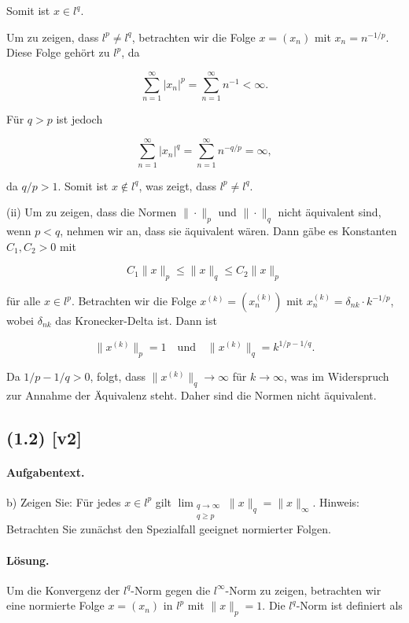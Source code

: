 \documentclass[11pt,a4paper]{article}
\begin{document}
Somit ist \( x \in l^q \).

Um zu zeigen, dass \( l^p \neq l^q \), betrachten wir die Folge \( x = (x_n) \) mit \( x_n = n^{-1/p} \). Diese Folge gehört zu \( l^p \), da

\[
\sum_{n=1}^{\infty} |x_n|^p = \sum_{n=1}^{\infty} n^{-1} < \infty.
\]

Für \( q > p \) ist jedoch

\[
\sum_{n=1}^{\infty} |x_n|^q = \sum_{n=1}^{\infty} n^{-q/p} = \infty,
\]

da \( q/p > 1 \). Somit ist \( x \notin l^q \), was zeigt, dass \( l^p \neq l^q \).

(ii) Um zu zeigen, dass die Normen \( \|\cdot\|_p \) und \( \|\cdot\|_q \) nicht äquivalent sind, wenn \( p < q \), nehmen wir an, dass sie äquivalent wären. Dann gäbe es Konstanten \( C_1, C_2 > 0 \) mit

\[
C_1 \|x\|_p \leq \|x\|_q \leq C_2 \|x\|_p
\]

für alle \( x \in l^p \). Betrachten wir die Folge \( x^{(k)} = (x_n^{(k)}) \) mit \( x_n^{(k)} = \delta_{nk} \cdot k^{-1/p} \), wobei \( \delta_{nk} \) das Kronecker-Delta ist. Dann ist

\[
\|x^{(k)}\|_p = 1 \quad \text{und} \quad \|x^{(k)}\|_q = k^{1/p - 1/q}.
\]

Da \( 1/p - 1/q > 0 \), folgt, dass \( \|x^{(k)}\|_q \to \infty \) für \( k \to \infty \), was im Widerspruch zur Annahme der Äquivalenz steht. Daher sind die Normen nicht äquivalent.


\subsection*{(1.2) [v2]}
\paragraph{Aufgabentext.}
b) Zeigen Sie: Für jedes $x \in l^p$ gilt $\lim _{\substack{q \rightarrow \infty \\ q \geq p}}\|x\|_q=\|x\|_{\infty}$.
Hinweis: Betrachten Sie zunächst den Spezialfall geeignet normierter Folgen.

\paragraph{Lösung.}
Um die Konvergenz der \( l^q \)-Norm gegen die \( l^\infty \)-Norm zu zeigen, betrachten wir eine normierte Folge \( x = (x_n) \) in \( l^p \) mit \( \|x\|_p = 1 \). Die \( l^q \)-Norm ist definiert als 
\end{document}
